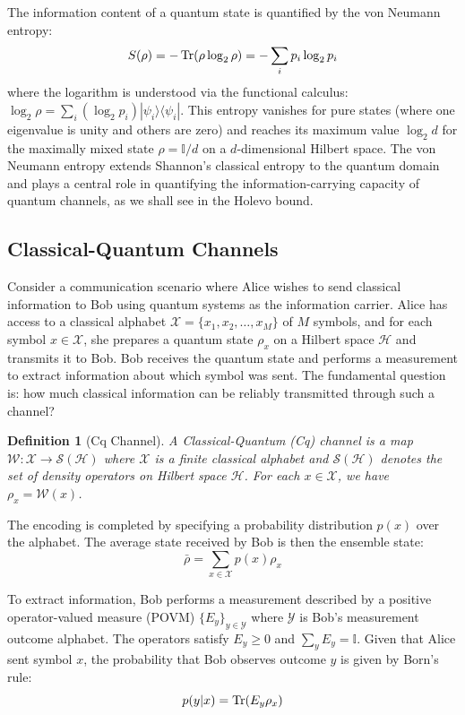\documentclass[12pt,a4paper]{article}
\newtheorem{definition}[theorem]{Definition}
\newcommand{\cH}{\mathcal{H}}
\begin{document}
The information content of a quantum state is quantified by the von Neumann entropy:
\begin{equation}
S(\rho) = -\Tr(\rho \log_2 \rho) = -\sum_{i} p_i \log_2 p_i
\end{equation}
where the logarithm is understood via the functional calculus: $\log_2 \rho = \sum_i (\log_2 p_i) |\psi_i\rangle\langle\psi_i|$. This entropy vanishes for pure states (where one eigenvalue is unity and others are zero) and reaches its maximum value $\log_2 d$ for the maximally mixed state $\rho = \mathbb{I}/d$ on a $d$-dimensional Hilbert space. The von Neumann entropy extends Shannon's classical entropy to the quantum domain and plays a central role in quantifying the information-carrying capacity of quantum channels, as we shall see in the Holevo bound.

\subsection{Classical-Quantum Channels}

Consider a communication scenario where Alice wishes to send classical information to Bob using quantum systems as the information carrier. Alice has access to a classical alphabet $\mathcal{X} = \{x_1, x_2, \ldots, x_M\}$ of $M$ symbols, and for each symbol $x \in \mathcal{X}$, she prepares a quantum state $\rho_x$ on a Hilbert space $\cH$ and transmits it to Bob. Bob receives the quantum state and performs a measurement to extract information about which symbol was sent. The fundamental question is: how much classical information can be reliably transmitted through such a channel?

\begin{definition}[Cq Channel]
A Classical-Quantum (Cq) channel is a map $\mathcal{W}: \mathcal{X} \to \mathcal{S}(\cH)$ where $\mathcal{X}$ is a finite classical alphabet and $\mathcal{S}(\cH)$ denotes the set of density operators on Hilbert space $\cH$. For each $x \in \mathcal{X}$, we have $\rho_x = \mathcal{W}(x)$.
\end{definition}

The encoding is completed by specifying a probability distribution $p(x)$ over the alphabet. The average state received by Bob is then the ensemble state:
\begin{equation}
\bar{\rho} = \sum_{x \in \mathcal{X}} p(x) \rho_x
\end{equation}

To extract information, Bob performs a measurement described by a positive operator-valued measure (POVM) $\{E_y\}_{y \in \mathcal{Y}}$ where $\mathcal{Y}$ is Bob's measurement outcome alphabet. The operators satisfy $E_y \geq 0$ and $\sum_{y} E_y = \mathbb{I}$. Given that Alice sent symbol $x$, the probability that Bob observes outcome $y$ is given by Born's rule:
\begin{equation}
p(y|x) = \Tr(E_y \rho_x)
\end{equation}
\end{document}
